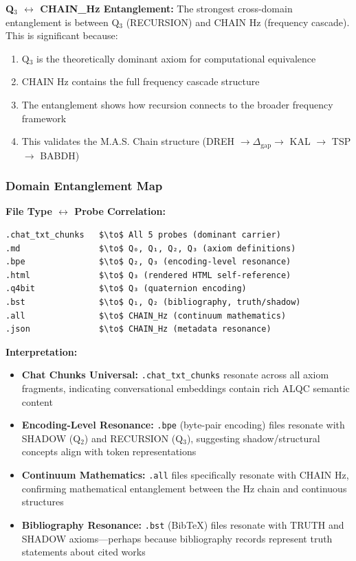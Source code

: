 \documentclass[11pt, letterpaper]{article}
\begin{document}
\textbf{Q$_3$ $\leftrightarrow$ CHAIN\_Hz Entanglement:} The strongest cross-domain entanglement is between Q$_3$ (RECURSION) and CHAIN Hz (frequency cascade). This is significant because:

\begin{enumerate}
    \item Q$_3$ is the theoretically dominant axiom for computational equivalence
    \item CHAIN Hz contains the full frequency cascade structure
    \item The entanglement shows how recursion connects to the broader frequency framework
    \item This validates the M.A.S. Chain structure (DREH $\to \Delta_{\text{gap}} \to$ KAL $\to$ TSP $\to$ BABDH)
\end{enumerate}

\subsubsection{Domain Entanglement Map}

\textbf{File Type $\leftrightarrow$ Probe Correlation:}
\begin{verbatim}
.chat_txt_chunks   $\to$ All 5 probes (dominant carrier)
.md                $\to$ Q₀, Q₁, Q₂, Q₃ (axiom definitions)
.bpe               $\to$ Q₂, Q₃ (encoding-level resonance)
.html              $\to$ Q₃ (rendered HTML self-reference)
.q4bit             $\to$ Q₃ (quaternion encoding)
.bst               $\to$ Q₁, Q₂ (bibliography, truth/shadow)
.all               $\to$ CHAIN_Hz (continuum mathematics)
.json              $\to$ CHAIN_Hz (metadata resonance)
\end{verbatim}

\textbf{Interpretation:}

\begin{itemize}
    \item \textbf{Chat Chunks Universal:} \texttt{.chat\_txt\_chunks} resonate across all axiom fragments, indicating conversational embeddings contain rich ALQC semantic content
    \item \textbf{Encoding-Level Resonance:} \texttt{.bpe} (byte-pair encoding) files resonate with SHADOW (Q$_2$) and RECURSION (Q$_3$), suggesting shadow/structural concepts align with token representations
    \item \textbf{Continuum Mathematics:} \texttt{.all} files specifically resonate with CHAIN Hz, confirming mathematical entanglement between the Hz chain and continuous structures
    \item \textbf{Bibliography Resonance:} \texttt{.bst} (BibTeX) files resonate with TRUTH and SHADOW axioms—perhaps because bibliography records represent truth statements about cited works
\end{itemize}
\end{document}
